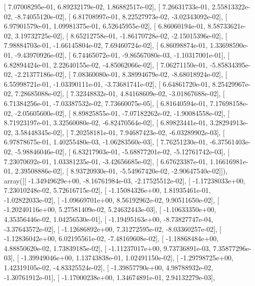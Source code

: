 \documentclass{article}
\begin{document}
       [  7.07008295e-01,   6.89232179e-02,   1.86882517e-02],
       [  7.26631733e-01,   2.55813322e-02,  -8.74055120e-02],
       [  6.81708997e-01,   8.22527973e-02,  -3.02343092e-02],
       [  6.97901579e-01,   1.09981375e-01,   6.52645955e-02],
       [  6.86060194e-01,   8.58733621e-02,   3.19732725e-02],
       [  8.65212758e-01,  -1.86170728e-02,  -2.15015396e-02],
       [  7.98884703e-01,  -1.66145804e-02,   7.69460724e-02],
       [  6.86098874e-01,   1.33698590e-01,  -9.43970926e-02],
       [  6.74465072e-01,  -9.86567080e-03,  -1.10317001e-01],
       [  6.82894424e-01,   2.22640155e-02,  -4.85062066e-02],
       [  7.06271150e-01,  -5.85834395e-02,  -2.21377186e-02],
       [  7.08360080e-01,   8.38994679e-02,  -8.68018924e-02],
       [  6.55998721e-01,  -1.03390111e-01,  -3.73681741e-02],
       [  6.64861720e-01,   8.25429967e-02,   7.28685088e-02],
       [  7.32348832e-01,   4.84168609e-02,  -3.01867688e-02],
       [  6.71384256e-01,  -7.03387532e-02,   7.73660075e-05],
       [  6.81640594e-01,   7.17698158e-02,  -2.05605600e-02],
       [  8.89825855e-01,  -7.07182262e-02,  -1.90084558e-02],
       [  8.71923197e-01,   3.32560080e-02,  -6.82470564e-02],
       [  6.89823441e-01,   3.28294913e-02,   3.58448345e-02],
       [  7.20258181e-01,   7.94687423e-02,  -6.03289902e-03],
       [  6.97878675e-01,   1.40255480e-03,  -1.06283560e-03],
       [  7.76251230e-01,  -6.37561403e-02,  -5.98846046e-02],
       [  6.83217903e-01,  -5.68877201e-02,  -5.12761742e-03],
       [  7.23070692e-01,   1.03381235e-01,  -3.42656685e-02],
       [  6.67623387e-01,   1.16616981e-01,   2.39508886e-02],
       [  8.93720930e-01,  -5.54967420e-02,  -2.90647540e-02]]), array([[ -1.34949629e+00,  -8.16761984e-03,  -2.17525512e-02],
       [ -1.17238033e+00,   7.23010248e-02,   5.72616715e-02],
       [ -1.15084326e+00,   1.81935461e-01,  -1.02822033e-02],
       [ -1.09669701e+00,   8.56192962e-02,   9.90511650e-02],
       [ -1.20240116e+00,   5.27581409e-02,   5.24632443e-03],
       [ -1.10633350e+00,   4.35356446e-02,   1.04256530e-01],
       [ -1.19495163e+00,  -8.73827747e-04,  -3.37643572e-02],
       [ -1.12686892e+00,   7.31272595e-02,  -8.03360257e-02],
       [ -1.12836042e+00,   6.02195561e-02,  -7.48169608e-02],
       [ -1.18868484e+00,   4.88850620e-02,   1.73839185e-02],
       [ -1.11237017e+00,   9.73736891e-03,   7.35877296e-03],
       [ -1.39949046e+00,   1.13743838e-01,   1.02491150e-02],
       [ -1.29798725e+00,   1.42319105e-02,  -4.83325524e-02],
       [ -1.39857790e+00,   4.98788932e-02,  -1.30761912e-01],
       [ -1.17000238e+00,   1.34674891e-01,   2.94132279e-03],
\end{document}
